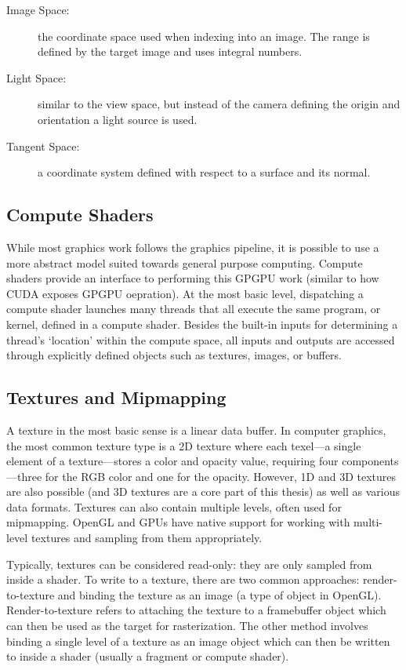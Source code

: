 \begin{description}
    \item[Image Space:] the coordinate space used when indexing into an image. The range is defined by the target image and uses integral numbers.
    \item[Light Space:] similar to the view space, but instead of the camera defining the origin and orientation a light source is used.
    \item[Tangent Space:] a coordinate system defined with respect to a surface and its normal.
\end{description}

\subsection{Compute Shaders}
While most graphics work follows the graphics pipeline, it is possible to use a more abstract model suited towards general purpose computing. Compute shaders provide an interface to performing this GPGPU work (similar to how CUDA exposes GPGPU oepration). At the most basic level, dispatching a compute shader launches many threads that all execute the same program, or kernel, defined in a compute shader. Besides the built-in inputs for determining a thread's `location' within the compute space, all inputs and outputs are accessed through explicitly defined objects such as textures, images, or buffers.

\subsection{Textures and Mipmapping}
A texture in the most basic sense is a linear data buffer. In computer graphics, the most common texture type is a 2D texture where each texel---a single element of a texture---stores a color and opacity value, requiring four components---three for the RGB color and one for the opacity. However, 1D and 3D textures are also possible (and 3D textures are a core part of this thesis) as well as various data formats. Textures can also contain multiple levels, often used for mipmapping. OpenGL and GPUs have native support for working with multi-level textures and sampling from them appropriately.

Typically, textures can be considered read-only: they are only sampled from inside a shader. To write to a texture, there are two common approaches: render-to-texture and binding the texture as an image (a type of object in OpenGL). Render-to-texture refers to attaching the texture to a framebuffer object which can then be used as the target for rasterization. The other method involves binding a single level of a texture as an image object which can then be written to inside a shader (usually a fragment or compute shader).

